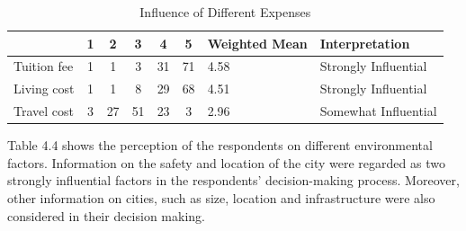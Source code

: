 \begin{table}[H]
\centering
\caption{Influence of Different Expenses}
\label{my-label}
\begin{tabular}{|p{4cm}|c|c|c|c|c|p{2cm}|p{3cm}|}
\hline
            & \textbf{1} & \textbf{2} & \textbf{3} & \textbf{4} & \textbf{5} & \textbf{Weighted Mean} & \textbf{Interpretation} \\ \hline
Tuition fee & 1          & 1          & 3          & 31         & 71         & 4.58                   & Strongly Influential    \\ \hline
Living cost & 1          & 1          & 8          & 29         & 68         & 4.51                   & Strongly Influential    \\ \hline
Travel cost & 3          & 27         & 51         & 23         & 3          & 2.96                   & Somewhat Influential    \\ \hline
\end{tabular}
\end{table}

Table 4.4 shows the perception of the respondents on different environmental factors. Information on the safety and location of the city were regarded as two strongly influential factors in the respondents’ decision-making process. Moreover, other information on cities, such as size, location and infrastructure were also considered in their decision making.


